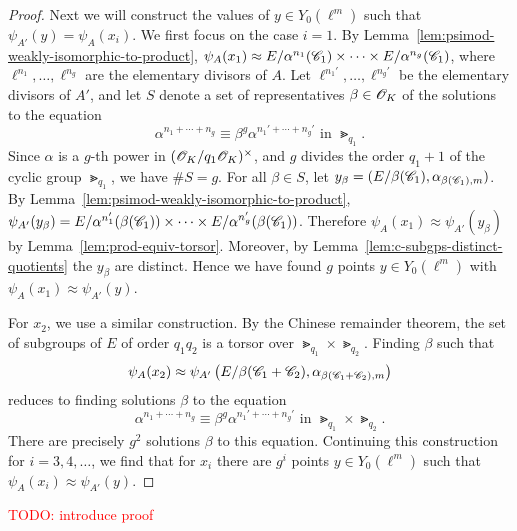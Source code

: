 \documentclass{amsart}
\begin{document}
\begin{proof}
    Next we will construct the values of $y \in Y_0(\ell^m)$ such that $\psi_{A'}(y) = \psi_{A}(x_i)$. We first focus on the case $i = 1$. By Lemma~\ref{lem:psimod-weakly-isomorphic-to-product}, $\psi_{A}(x_1) \approx E/\alpha^{n_1}(\mathscr{C}_1) \times \cdots \times E/\alpha^{n_g}(\mathscr{C}_1)$, where $\ell^{n_1},\dots,\ell^{n_g}$ are the elementary divisors of $A$. 
    Let $\ell^{n_1'},\dots,\ell^{n_g'}$ be the elementary divisors of $A'$, and let $S$ denote a set of representatives $\beta \in \mathscr{O}_K$ of the solutions to the equation
    \[
      \alpha^{n_1 + \cdots + n_g} \equiv \beta^g\alpha^{n_1' + \cdots + n_g'}
      \text{ in } \Gt_{q_1}.
    \]
Since $\alpha$ is a $g$-th power in  $(\mathscr{O}_K/q_1\mathscr{O}_K)^\times$, and  $g$ divides the order $q_1 + 1$ of the cyclic group $\Gt_{q_1}$, 
   we have $\#S = g$. For all $\beta \in S$, let $y_\beta = (E/\beta(\mathscr{C}_1),\alpha_{\beta(\mathscr{C}_1),m})$. By Lemma~\ref{lem:psimod-weakly-isomorphic-to-product}, $\psi_{A'}(y_\beta) = E/\alpha^{n_1'}(\beta(\mathscr{C}_1)) \times \cdots \times E/\alpha^{n_g'}(\beta(\mathscr{C}_1))$. Therefore $\psi_A(x_1) \approx \psi_{A'}(y_\beta)$ by Lemma~\ref{lem:prod-equiv-torsor}. Moreover, by Lemma~\ref{lem:c-subgps-distinct-quotients} the $y_\beta$ are distinct. Hence we have found $g$ points $y \in Y_0(\ell^m)$ with $\psi_{A}(x_1) \approx \psi_{A'}(y)$.

  For $x_2$, we use a similar construction. By the Chinese remainder theorem, the set of subgroups of $E$ of order $q_1q_2$ is a torsor over $\Gt_{q_1} \times \Gt_{q_2}$. Finding $\beta$ such that
  \[
    \psi_{A}(x_2) \approx \psi_{A'}\left(E/\beta(\mathscr{C}_1+\mathscr{C}_2),\alpha_{\beta(\mathscr{C}_1+\mathscr{C}_2),m}\right)
  \]
  reduces to finding solutions $\beta$ to the equation
  \[
    \alpha^{n_1 + \cdots + n_g} \equiv \beta^g\alpha^{n_1' + \cdots + n_g'}
    \text{ in } \Gt_{q_1} \times \Gt_{q_2}.
  \]
There are precisely $g^2$ solutions $\beta$ to this equation. Continuing this construction for $i=3,4,\dots$, we find that for $x_i$ there are $g^i$ points $y \in Y_0(\ell^m)$ such that $\psi_{A}(x_i) \approx \psi_{A'}(y)$.
\end{proof}

\textcolor{red}{TODO: introduce proof}
\end{document}
